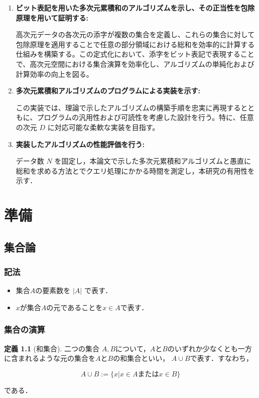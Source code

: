 \documentclass{jsreport}
\theoremstyle{plain} %
\theoremstyle{definition}
\newtheorem{definition}{定義}
\begin{document}
\begin{enumerate}
    \item \textbf{ビット表記を用いた多次元累積和のアルゴリズムを示し、その正当性を包除原理を用いて証明する:}


     高次元データの各次元の添字が複数の集合を定義し、これらの集合に対して包除原理を適用することで任意の部分領域における総和を効率的に計算する仕組みを構築する。この定式化において、添字をビット表記で表現することで、高次元空間における集合演算を効率化し、アルゴリズムの単純化および計算効率の向上を図る。

    \item \textbf{多次元累積和アルゴリズムのプログラムによる実装を示す:}

    この実装では、理論で示したアルゴリズムの構築手順を忠実に再現するとともに、プログラムの汎用性および可読性を考慮した設計を行う。特に、任意の次元 \(D\) に対応可能な柔軟な実装を目指す。

    \item \textbf{実装したアルゴリズムの性能評価を行う:}

    データ数 \(N\) を固定し，本論文で示した多次元累積和アルゴリズムと愚直に総和を求める方法とでクエリ処理にかかる時間を測定し，本研究の有用性を示す．

\end{enumerate}

\chapter{準備}

\section{集合論}
\subsection{記法}

\begin{itemize}
    \item 集合$A$の要素数を $|A|$ で表す．
    \item $x$が集合$A$の元であることを$x \in A$で表す．
\end{itemize}

\subsection{集合の演算}

\begin{definition}[和集合]
    二つの集合 $A, B$について，$A$と$B$のいずれか少なくとも一方に含まれるような元の集合を$A$と$B$の和集合といい， $A \cup B$で表す．すなわち，

    \begin{equation}
        A \cup B := \{x | x \in A または x \in B \}
    \end{equation}

    である．

\end{definition}
\end{document}
